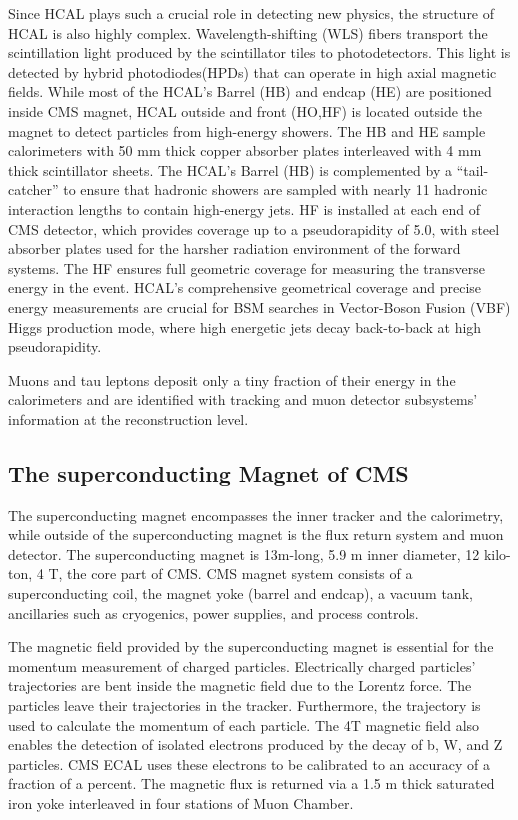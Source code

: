 Since HCAL plays such a crucial role in detecting new physics, the structure of HCAL is also highly complex.
Wavelength-shifting (WLS) fibers transport the scintillation light produced by the scintillator tiles to photodetectors.
This light is detected by hybrid photodiodes(HPDs) that can operate in high axial magnetic fields.
While most of the HCAL's Barrel (HB) and endcap (HE) are positioned inside CMS magnet, HCAL outside and front (HO,HF) is located outside the magnet to detect particles from high-energy showers.
The HB and HE sample calorimeters with 50 mm thick copper absorber plates interleaved with 4 mm thick scintillator sheets.
The HCAL's Barrel (HB) is complemented by a ``tail-catcher'' to ensure that hadronic showers are sampled with nearly 11 hadronic interaction lengths to contain high-energy jets.
HF is installed at each end of CMS detector, which provides coverage up to a pseudorapidity of 5.0, with steel absorber plates used for the harsher radiation environment of the forward systems.
The HF ensures full geometric coverage for measuring the transverse energy in the event.
HCAL's comprehensive geometrical coverage and precise energy measurements are crucial for BSM searches in Vector-Boson Fusion (VBF) Higgs production mode, where high energetic jets decay back-to-back at high pseudorapidity.

Muons and tau leptons deposit only a tiny fraction of their energy in the calorimeters and are identified with tracking and muon detector subsystems' information at the reconstruction level.
\subsection{The superconducting Magnet  of CMS}
The superconducting magnet encompasses the inner tracker and the calorimetry, while outside of the superconducting magnet is the flux return system and muon detector.
The superconducting magnet is 13m-long, 5.9 m inner diameter, 12 kilo-ton, 4 T, the core part of CMS.
CMS magnet system consists of a superconducting coil, the magnet yoke (barrel and endcap), a vacuum tank, ancillaries such as cryogenics, power supplies, and process controls.

The magnetic field provided by the superconducting magnet is essential for the momentum measurement of charged particles.
Electrically charged particles' trajectories are bent inside the magnetic field due to the Lorentz force.
The particles leave their trajectories in the tracker. 
Furthermore, the trajectory is used to calculate the momentum of each particle.
The 4T magnetic field also enables the detection of isolated electrons produced by the decay of b, W, and Z particles.
CMS ECAL uses these electrons to be calibrated to an accuracy of a fraction of a percent.
The magnetic flux is returned via a 1.5 m thick saturated iron yoke interleaved in four stations of Muon Chamber.
